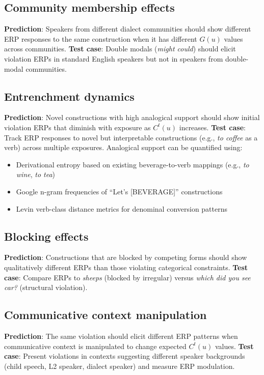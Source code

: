 \documentclass[12pt,letterpaper]{article}
\begin{document}
\subsection{Community membership effects}
\textbf{Prediction}: Speakers from different dialect communities should show different ERP responses to the same construction when it has different $G(u)$ values across communities.
\textbf{Test case}: Double modals (\textit{might could}) should elicit violation ERPs in standard English speakers but not in speakers from double-modal communities.

\subsection{Entrenchment dynamics}
\textbf{Prediction}: Novel constructions with high analogical support should show initial violation ERPs that diminish with exposure as $C^t(u)$ increases.
\textbf{Test case}: Track ERP responses to novel but interpretable constructions (e.g., \textit{to coffee} as a verb) across multiple exposures. Analogical support can be quantified using:
\begin{itemize}
    \item Derivational entropy based on existing beverage-to-verb mappings (e.g., \textit{to wine}, \textit{to tea})
    \item Google n-gram frequencies of \enquote{Let's [BEVERAGE]} constructions
    \item Levin verb-class distance metrics for denominal conversion patterns
\end{itemize}

\subsection{Blocking effects}
\textbf{Prediction}: Constructions that are blocked by competing forms should show qualitatively different ERPs than those violating categorical constraints.
\textbf{Test case}: Compare ERPs to \textit{sheeps} (blocked by irregular) versus \textit{which did you see car?} (structural violation).

\subsection{Communicative context manipulation}
\textbf{Prediction}: The same violation should elicit different ERP patterns when communicative context is manipulated to change expected $C^t(u)$ values.
\textbf{Test case}: Present violations in contexts suggesting different speaker backgrounds (child speech, L2 speaker, dialect speaker) and measure ERP modulation.
\end{document}
